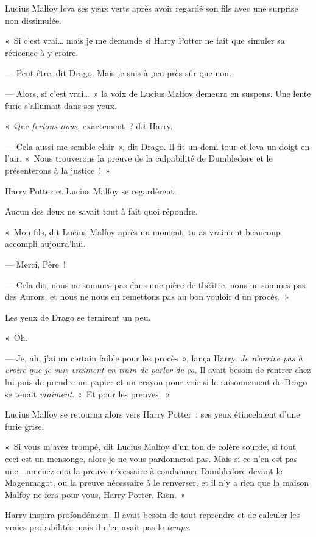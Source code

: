 Lucius Malfoy leva ses yeux verts après avoir regardé son fils avec une surprise non dissimulée.

«~Si c'est vrai… mais je me demande si Harry Potter ne fait que simuler sa réticence à y croire.

--- Peut-être, dit Drago.
Mais je suis à peu près sûr que non.

--- Alors, si c'est vrai…~»
la voix de Lucius Malfoy demeura en suspens.
Une lente furie s'allumait dans ses yeux.

«~Que \emph{ferions-nous}, exactement~? dit Harry.

--- Cela aussi me semble clair~», dit Drago.
Il fit un demi-tour et leva un doigt en l'air.
«~Nous trouverons la preuve de la culpabilité de Dumbledore et le présenterons à la justice~!~»

Harry Potter et Lucius Malfoy se regardèrent.

Aucun des deux ne savait tout à fait quoi répondre.

«~Mon fils, dit Lucius Malfoy après un moment, tu as vraiment beaucoup accompli aujourd'hui.

--- Merci, Père~!

--- Cela dit, nous ne sommes pas dans une pièce de théâtre, nous ne sommes pas des Aurors, et nous ne nous en remettons pas au bon vouloir d'un procès.~»

Les yeux de Drago se ternirent un peu.

«~Oh.

--- Je, ah, j'ai un certain faible pour les procès~», lança Harry.
\emph{Je n'arrive pas à croire que je suis vraiment en train de parler de ça}.
Il avait besoin de rentrer chez lui puis de prendre un papier et un crayon pour voir si le raisonnement de Drago se tenait \emph{vraiment}.
«~Et pour les preuves.~»

Lucius Malfoy se retourna alors vers Harry Potter~; ses yeux étincelaient d'une furie grise.

«~Si vous m'avez trompé, dit Lucius Malfoy d'un ton de colère sourde, si tout ceci est un mensonge, alors je ne vous pardonnerai pas.
Mais si ce n'en est pas une… amenez-moi la preuve nécessaire à condamner Dumbledore devant le Magenmagot, ou la preuve nécessaire à le renverser, et il n'y a rien que la maison Malfoy ne fera pour vous, Harry Potter.
Rien.~»

Harry inspira profondément.
Il avait besoin de tout reprendre et de calculer les vraies probabilités mais il n'en avait pas le \emph{temps}.

